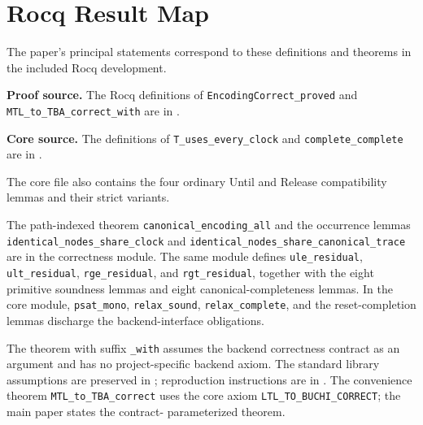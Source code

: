 \documentclass[10pt,journal,compsoc]{IEEEtran}
\begin{document}
\section{Rocq Result Map}
\label{app:rocq}
\begingroup
\raggedright
The paper's principal statements correspond to these definitions and
theorems in the included Rocq development.\par\smallskip
\noindent\textbf{Proof source.} The Rocq definitions of
\texttt{EncodingCorrect\_proved} and
\texttt{MTL\_to\_TBA\_correct\_with} are in
.\par\smallskip
\noindent\textbf{Core source.} The definitions of
\texttt{T\_uses\_every\_clock} and \texttt{complete\_complete} are in
.\par\smallskip
The core file also contains the four ordinary Until and Release compatibility
lemmas and their strict variants.\par\smallskip
The path-indexed theorem \texttt{canonical\_encoding\_all} and the occurrence
lemmas \texttt{identical\_nodes\_share\_clock} and
\texttt{identical\_nodes\_share\_canonical\_trace} are in the correctness
module. The same module defines \texttt{ule\_residual},
\texttt{ult\_residual}, \texttt{rge\_residual}, and
\texttt{rgt\_residual}, together with the eight primitive soundness lemmas
and eight canonical-completeness lemmas. In the core module,
\texttt{psat\_mono}, \texttt{relax\_sound}, \texttt{relax\_complete}, and
the reset-completion lemmas discharge the backend-interface obligations.\par\smallskip
The theorem with suffix \texttt{\_with} assumes the backend correctness
contract as an argument and has no project-specific backend axiom. The standard
library assumptions are preserved in ; reproduction
instructions are in . The convenience theorem
\texttt{MTL\_to\_TBA\_correct} uses the core axiom
\texttt{LTL\_TO\_BUCHI\_CORRECT}; the main paper states the contract-
parameterized theorem.
\par
\endgroup
\end{document}
